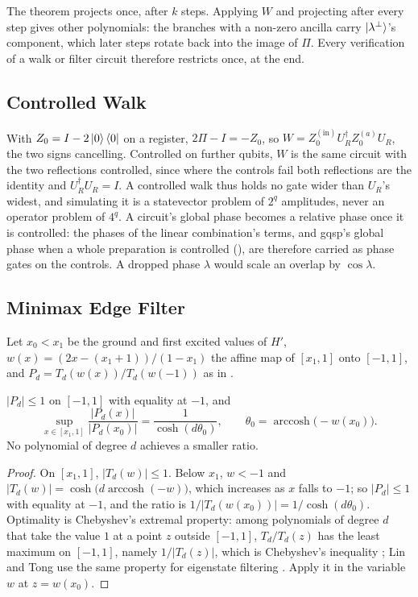 The theorem projects once, after $k$ steps. Applying $W$ and projecting after every step gives other polynomials: the branches with a non-zero ancilla carry $\ket{\lambda^\perp}$'s component, which later steps rotate back into the image of $\Pi$. Every verification of a walk or filter circuit therefore restricts once, at the end.

\subsection{Controlled Walk}
\label{app:controlled-walk}

With $Z_0=I-2\ket0\bra0$ on a register, $2\Pi-I=-Z_0$, so $W=Z_0^{(\mathrm{in})}U_R^\dagger Z_0^{(a)}U_R$, the two signs cancelling. Controlled on further qubits, $W$ is the same circuit with the two reflections controlled, since where the controls fail both reflections are the identity and $U_R^\dagger U_R=I$. A controlled walk thus holds no gate wider than $U_R$'s widest, and simulating it is a statevector problem of $2^q$ amplitudes, never an operator problem of $4^q$. A circuit's global phase becomes a relative phase once it is controlled: the phases of the linear combination's terms, and \gls{gqsp}'s global phase when a whole preparation is controlled (), are therefore carried as phase gates on the controls. A dropped phase $\lambda$ would scale an overlap by $\cos\lambda$.

\subsection{Minimax Edge Filter}
\label{app:minimax-filter}

Let $x_0<x_1$ be the ground and first excited values of $H'$, $w(x)=(2x-(x_1+1))/(1-x_1)$ the affine map of $[x_1,1]$ onto $[-1,1]$, and $P_d=T_d(w(x))/T_d(w(-1))$ as in .

\begin{proposition}
\label{prop:minimax-optimal}
$|P_d|\le1$ on $[-1,1]$ with equality at $-1$, and
\begin{equation*}
    \sup_{x\in[x_1,1]}\frac{|P_d(x)|}{|P_d(x_0)|}=\frac{1}{\cosh(d\theta_0)},
    \qquad\theta_0=\operatorname{arccosh}\bigl(-w(x_0)\bigr).
\end{equation*}
No polynomial of degree $d$ achieves a smaller ratio.
\end{proposition}
\begin{proof}
On $[x_1,1]$, $|T_d(w)|\le1$. Below $x_1$, $w<-1$ and $|T_d(w)|=\cosh\bigl(d\operatorname{arccosh}(-w)\bigr)$, which increases as $x$ falls to $-1$; so $|P_d|\le1$ with equality at $-1$, and the ratio is $1/|T_d(w(x_0))|=1/\cosh(d\theta_0)$. Optimality is Chebyshev's extremal property: among polynomials of degree $d$ that take the value $1$ at a point $z$ outside $[-1,1]$, $T_d/T_d(z)$ has the least maximum on $[-1,1]$, namely $1/|T_d(z)|$, which is Chebyshev's inequality \cite{borweinerdelyi1995}; Lin and Tong use the same property for eigenstate filtering \cite{lintong2020filtering}. Apply it in the variable $w$ at $z=w(x_0)$.
\end{proof}

